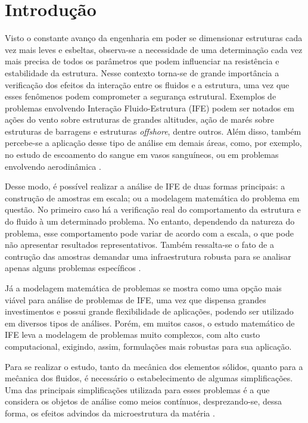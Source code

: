 \documentclass[_ArquivoPrincipal.tex]{subfiles}
\begin{document}
\chapter{Introdução}

Visto o constante avanço da engenharia em poder se dimensionar estruturas cada vez mais leves e esbeltas, observa-se a necessidade de uma determinação cada vez mais precisa de todos os parâmetros que podem influenciar na resistência e estabilidade da estrutura. Nesse contexto torna-se de grande importância a verificação dos efeitos da interação entre os fluidos e a estrutura, uma vez que esses fenômenos podem comprometer a segurança estrutural. Exemplos de problemas envolvendo Interação Fluido-Estrutura (IFE) podem ser notados em ações do vento sobre estruturas de grandes altitudes, ação de marés sobre estruturas de barragens e estruturas \textit{offshore}, dentre outros. Além disso, também percebe-se a aplicação desse tipo de análise em demais áreas, como, por exemplo, no estudo de escoamento do sangue em vasos sanguíneos, ou em problemas envolvendo aerodinâmica \cite{sanches2014fluid, fernandes2020tecnica}.

Desse modo, é possível realizar a análise de IFE de duas formas principais: a construção de amostras em escala; ou a modelagem matemática do problema em questão. No primeiro caso há a verificação real do comportamento da estrutura e do fluido à um determinado problema. No entanto, dependendo da natureza do problema, esse comportamento pode variar de acordo com a escala, o que pode não apresentar resultados representativos. Também ressalta-se o fato de a contrução das amostras demandar uma infraestrutura robusta para se analisar apenas alguns problemas específicos \cite{fernandes2020tecnica}.

Já a modelagem matemática de problemas se mostra como uma opção mais viável para análise de problemas de IFE, uma vez que dispensa grandes investimentos e possui grande flexibilidade de aplicações, podendo ser utilizado em diversos tipos de análises. Porém, em muitos casos, o estudo matemático de IFE leva a modelagem de problemas muito complexos, com alto custo computacional, exigindo, assim, formulações mais robustas para sua aplicação.

Para se realizar o estudo, tanto da mecânica dos elementos sólidos, quanto para a meĉanica dos fluidos, é necessário o estabelecimento de algumas simplificações. Uma das principais simplificações utilizada para esses problemas é a que considera os objetos de análise como meios contínuos, desprezando-se, dessa forma, os efeitos advindos da microestrutura da matéria \cite{lai2009introduction, mase2009continuum}.
\end{document}
